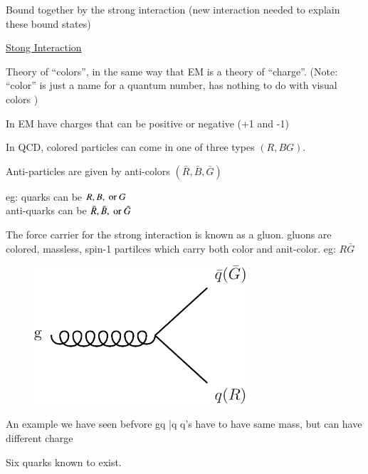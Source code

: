 {Bound together by the strong interaction (new interaction needed to explain these bound states) 

\underline{Stong Interaction} 

Theory of ``colors'', in the same way that EM is a theory of ``charge''. 
(Note: ``color'' is just a name for a quantum number, has nothing to do with visual colors ) 

In EM have charges that can be positive or negative (+1 and -1) 

In QCD, colored particles can come in one of three types $(R, B G)$. 

Anti-particles are given by anti-colors $(\bar{R}, \bar{B}, \bar{G})$ 

\begin{center}
eg: quarks can be $R, B, \textrm{ or } G$ \\
anti-quarks can be $\bar{R}, \bar{B}, \textrm{ or } \bar{G}$
\end{center}

The force carrier for the strong interaction is known as a gluon. 
gluons are colored, massless, spin-1 partilces which carry both color and anit-color. eg: $R\bar{G}$

\hspace*{1in}

\begin{minipage}{0.4\textwidth}
\begin{figure}[H]
\centering
\includegraphics[width=0.7\textwidth]{./gluonVertex.pdf} 
\end{figure}
\end{minipage} \hfill
\begin{minipage}{0.45\textwidth}
An example we have seen befvore
\be
g\rightarrow q \bar{q}
\ee
q's have to have same mass, but can have different charge
\end{minipage}

\clearpage

Six quarks known to exist. 

}
